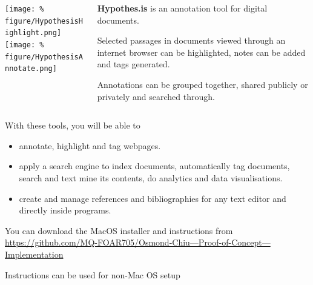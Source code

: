 \documentclass[unknownkeysallowed,usepdftitle=false, parskip=full, aspectratio=169]{beamer}
\newcommand{\secvariable}{nothing}
\newcommand{\mysection}[1]{\renewcommand{\secvariable}{#1}
}
\begin{document}
\begin{frame}\label{\secvariable}
  \begin{columns}[t]
  \begin{column}[c]{0.45\textwidth}
\texttt{[image: \%
figure/HypothesisHighlight.png]}\\
\vspace{1pt}
\texttt{[image: \%
figure/HypothesisAnnotate.png]}
    \end{column}
    \begin{column}[c]{0.45\textwidth}
    \parbox{\linewidth}{

\textbf{Hypothes.is} is an annotation tool for digital documents.\par
\vspace{12pt}
Selected passages in documents viewed through an internet browser can be highlighted, notes can be added and tags generated.\par
\vspace{12pt}
Annotations can be grouped together, shared publicly or privately and searched through. 
}
    \end{column}
    
  \end{columns}


\end{frame}

\mysection{conclusion}
\begin{frame}\label{\secvariable}
  
With these tools, you will be able to  
  \begin{itemize}
   \item annotate, highlight and tag webpages. 
  \item apply a search engine to index documents, automatically tag documents, search and text mine its contents, do analytics and data visualisations.
  \item create and manage references and bibliographies for any text editor and directly inside programs.

  \end{itemize}

  \vspace{0.5cm}
You can download the MacOS installer and instructions from \href{https://github.com/MQ-FOAR705/Osmond-Chiu---Proof-of-Concept---Implementation}{https://github.com/MQ-FOAR705/Osmond-Chiu---Proof-of-Concept---Implementation}\par 
\vspace{0.5cm}
Instructions can be used for non-Mac OS setup
\end{frame}
\end{document}
